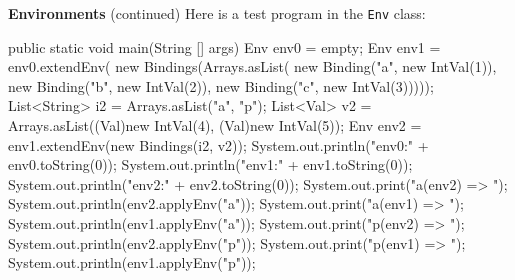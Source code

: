 \begin{minipage}[t]{\sw}
\slidenumber
\LARGE
{\bf Environments} (continued)\exx
\Large
Here is a test program in the \verb'Env' class:
\large
\begin{qv}
    public static void main(String [] args) {
        Env env0 = empty;
        Env env1 = env0.extendEnv(
            new Bindings(Arrays.asList(
                new Binding("a", new IntVal(1)),
                new Binding("b", new IntVal(2)),
                new Binding("c", new IntVal(3)))));
        List<String> i2 = Arrays.asList("a", "p");
        List<Val> v2 = Arrays.asList((Val)new IntVal(4), (Val)new IntVal(5));
        Env env2 = env1.extendEnv(new Bindings(i2, v2));
        System.out.println("env0:\n" + env0.toString(0));
        System.out.println("env1:\n" + env1.toString(0));
        System.out.println("env2:\n" + env2.toString(0));
        System.out.print("a(env2) => "); System.out.println(env2.applyEnv("a"));
        System.out.print("a(env1) => "); System.out.println(env1.applyEnv("a"));
        System.out.print("p(env2) => "); System.out.println(env2.applyEnv("p"));
        System.out.print("p(env1) => "); System.out.println(env1.applyEnv("p"));
    }
\end{qv}
\end{minipage}
